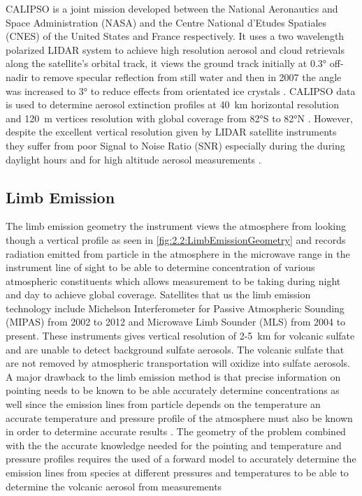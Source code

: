 CALIPSO is a joint mission developed between the National Aeronautics and Space Administration (NASA) and the Centre National d'Etudes Spatiales (CNES) of the United States and France respectively. It uses a two wavelength polarized LIDAR system to achieve high resolution aerosol and cloud retrievals along the satellite's orbital track, it views the ground track initially at 0.3\si{\degree} off-nadir to remove specular reflection from still water and then in 2007 the angle was increased to 3\si{\degree} to reduce effects from orientated ice crystals \citep{Hu2009}. CALIPSO data is used to determine aerosol extinction profiles at 40~km horizontal resolution and 120~m vertices resolution with global coverage from 82\si{\degree}S to 82\si{\degree}N \citep{Young2009}. However, despite the excellent vertical resolution given by LIDAR satellite instruments they suffer from poor Signal to Noise Ratio (SNR) especially during the during daylight hours and for high altitude aerosol measurements \citep{Kacenelenbogen2011}.

\subsection{Limb Emission}

The limb emission geometry the instrument views the atmosphere from looking though a vertical profile as seen in \autoref{fig:2.2:LimbEmissionGeometry} and records radiation emitted from particle in the atmosphere in the microwave range in the instrument line of sight to be able to determine concentration of various atmospheric constituents which allows measurement to be taking during night and day to achieve global coverage. Satellites that us the limb emission technology include Michelson Interferometer for Passive Atmospheric Sounding (MIPAS) \citep{Fischer2008} from 2002 to 2012 and Microwave Limb Sounder (MLS) \citep{Waters2006} from 2004 to present. These instruments gives vertical resolution of 2-5~km for volcanic sulfate \citep{Thomas2010} and are unable to detect background sulfate aerosols. The volcanic sulfate that are not removed by atmospheric transportation will oxidize into sulfate aerosols. A major drawback to the limb emission method is that precise information on pointing needs to be known to be able accurately determine concentrations as well since the emission lines from particle depends on the temperature an accurate temperature and pressure profile of the atmosphere must also be known in order to determine accurate results \citep{Von2003}. The geometry of the problem combined with the the accurate knowledge needed for the pointing and temperature and pressure profiles requires the used of a forward model to accurately determine the emission lines from species at different pressures and temperatures to be able to determine the volcanic aerosol from measurements \citep{Livesey2006}


